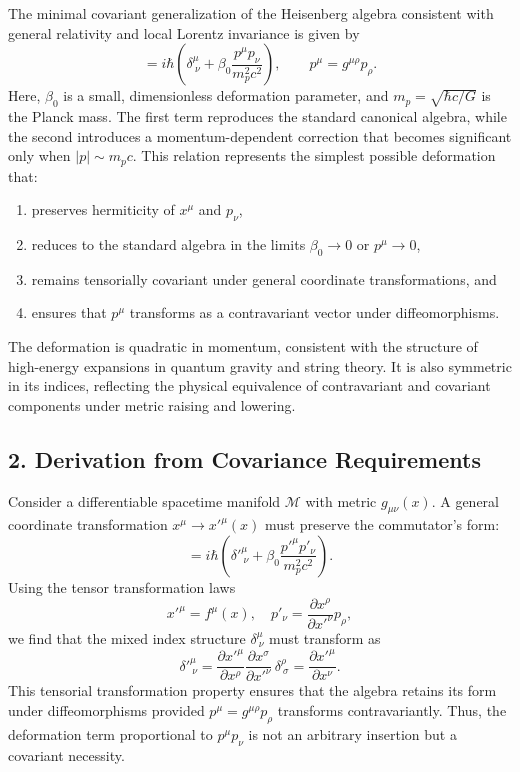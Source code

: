 \documentclass[11pt,oneside]{book}
\numberwithin{equation}{chapter}
\newcommand{\mpx}{m_p}               %
\newcommand{\betaz}{\beta_0}
\begin{document}
The minimal covariant generalization of the Heisenberg algebra consistent with general relativity and local Lorentz invariance is given by
\begin{equation}
[x^\mu,p_\nu]=i\hbar\left(\delta^\mu_{\ \nu}+\betaz \frac{p^\mu p_\nu}{\mpx^2 c^2}\right),
\qquad p^\mu=g^{\mu\rho}p_\rho.
\label{eq:rgup-algebra}
\end{equation}
Here, $\beta_0$ is a small, dimensionless deformation parameter, 
and $\mpx=\sqrt{\hbar c/G}$ is the Planck mass.
The first term reproduces the standard canonical algebra, while the second introduces a 
momentum-dependent correction that becomes significant only when $|p| \sim \mpx c$.
\clearpage
This relation represents the simplest possible deformation that:
\begin{enumerate}
\item preserves hermiticity of $x^\mu$ and $p_\nu$,
\item reduces to the standard algebra in the limits $\beta_0\to0$ or $p^\mu\to0$,
\item remains tensorially covariant under general coordinate transformations, and
\item ensures that $p^\mu$ transforms as a contravariant vector under diffeomorphisms.
\end{enumerate}
The deformation is quadratic in momentum, consistent with the structure of 
high-energy expansions in quantum gravity and string theory.
It is also symmetric in its indices, reflecting the physical equivalence of 
contravariant and covariant components under metric raising and lowering.

\subsection*{2. Derivation from Covariance Requirements}

Consider a differentiable spacetime manifold $\mathcal{M}$ with metric $g_{\mu\nu}(x)$.
A general coordinate transformation $x^\mu \rightarrow x'^\mu(x)$ must preserve
the commutator’s form:
\begin{equation}
[x'^\mu,p'_\nu] = i\hbar\left(\delta'^\mu_{\ \nu}
+ \beta_0 \frac{p'^\mu p'_\nu}{\mpx^2 c^2}\right).
\end{equation}
Using the tensor transformation laws
\begin{equation}
x'^\mu = f^\mu(x), \quad p'_\nu =
\frac{\partial x^\rho}{\partial x'^\nu}p_\rho,
\end{equation}
we find that the mixed index structure $\delta^\mu_{\ \nu}$
must transform as
\begin{equation}
\delta'^\mu_{\ \nu}=
\frac{\partial x'^\mu}{\partial x^\rho}
\frac{\partial x^\sigma}{\partial x'^\nu}\,\delta^\rho_{\ \sigma}
=\frac{\partial x'^\mu}{\partial x^\nu}.
\end{equation}
This tensorial transformation property ensures that the algebra retains its form under diffeomorphisms provided $p^\mu=g^{\mu\rho}p_\rho$ transforms contravariantly.
Thus, the deformation term proportional to $p^\mu p_\nu$
is not an arbitrary insertion but a covariant necessity.
\end{document}
